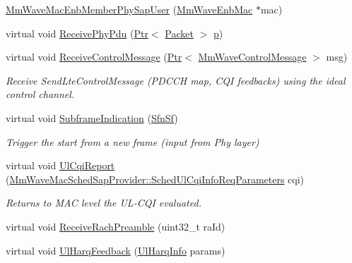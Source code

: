 \begin{DoxyCompactItemize}
\item 
\hyperlink{classns3_1_1MmWaveMacEnbMemberPhySapUser_acf17dcf4b0c0c5488360d41e07f4b71c}{Mm\+Wave\+Mac\+Enb\+Member\+Phy\+Sap\+User} (\hyperlink{classns3_1_1MmWaveEnbMac}{Mm\+Wave\+Enb\+Mac} $\ast$mac)
\item 
virtual void \hyperlink{classns3_1_1MmWaveMacEnbMemberPhySapUser_a9d2b2119ce2df674f21ba6ba78f905f6}{Receive\+Phy\+Pdu} (\hyperlink{classns3_1_1Ptr}{Ptr}$<$ \hyperlink{classns3_1_1Packet}{Packet} $>$ \hyperlink{lte__link__budget__x2__handover__measures_8m_ac9de518908a968428863f829398a4e62}{p})
\item 
virtual void \hyperlink{classns3_1_1MmWaveMacEnbMemberPhySapUser_a78e224077e90cbbf3909b8f5ec6260cd}{Receive\+Control\+Message} (\hyperlink{classns3_1_1Ptr}{Ptr}$<$ \hyperlink{classns3_1_1MmWaveControlMessage}{Mm\+Wave\+Control\+Message} $>$ msg)
\begin{DoxyCompactList}\small\item\em Receive Send\+Lte\+Control\+Message (P\+D\+C\+CH map, C\+QI feedbacks) using the ideal control channel. \end{DoxyCompactList}\item 
virtual void \hyperlink{classns3_1_1MmWaveMacEnbMemberPhySapUser_aa392156bf90b506ced929904b04fcded}{Subframe\+Indication} (\hyperlink{structns3_1_1SfnSf}{Sfn\+Sf})
\begin{DoxyCompactList}\small\item\em Trigger the start from a new frame (input from Phy layer) \end{DoxyCompactList}\item 
virtual void \hyperlink{classns3_1_1MmWaveMacEnbMemberPhySapUser_ac75a9e55f00c4da31c664fccca0b2fd1}{Ul\+Cqi\+Report} (\hyperlink{structns3_1_1MmWaveMacSchedSapProvider_1_1SchedUlCqiInfoReqParameters}{Mm\+Wave\+Mac\+Sched\+Sap\+Provider\+::\+Sched\+Ul\+Cqi\+Info\+Req\+Parameters} cqi)
\begin{DoxyCompactList}\small\item\em Returns to M\+AC level the U\+L-\/\+C\+QI evaluated. \end{DoxyCompactList}\item 
virtual void \hyperlink{classns3_1_1MmWaveMacEnbMemberPhySapUser_ad4e916c5c572ef8046ea8bb978f06042}{Receive\+Rach\+Preamble} (uint32\+\_\+t ra\+Id)
\item 
virtual void \hyperlink{classns3_1_1MmWaveMacEnbMemberPhySapUser_ab41d8bf2db68d82d95aed29b39c6b922}{Ul\+Harq\+Feedback} (\hyperlink{structns3_1_1UlHarqInfo}{Ul\+Harq\+Info} params)
\end{DoxyCompactItemize}
